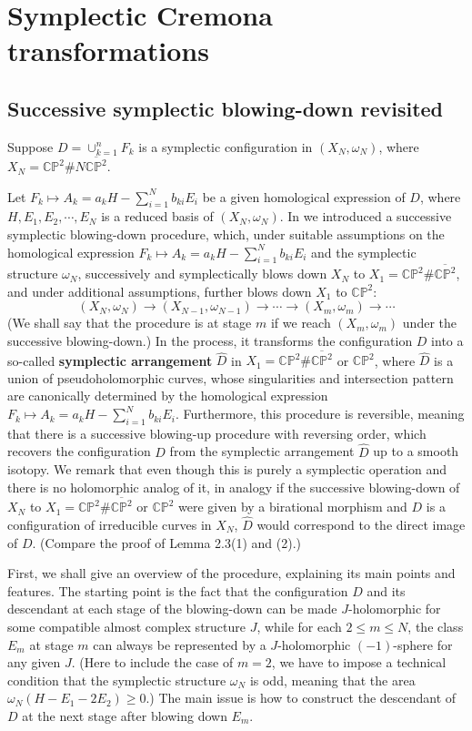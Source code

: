 \documentclass[11pt]{amsart}
\theoremstyle{plain}
\numberwithin{theorem}{section}
\theoremstyle{definition}
\newcommand{\C}{{\mathbb C}}
\renewcommand{\P}{{\mathbb P}}
\begin{document}
\section{Symplectic Cremona transformations}

\subsection{Successive symplectic blowing-down revisited}
Suppose $D=\cup_{k=1}^n F_k$ is a symplectic configuration in $(X_N,\omega_N)$, where $X_N=\C\P^2\# N\overline{\C\P^2}$. 

Let $F_k\mapsto A_k=a_k H-\sum_{i=1}^N b_{ki} E_i$ be a given homological expression of $D$, where $H,E_1,E_2,\cdots, E_N$ is a reduced basis of 
$(X_N,\omega_N)$. In \cite{C1} we introduced a successive symplectic blowing-down procedure, which, under suitable assumptions on the homological expression $F_k\mapsto A_k=a_k H-\sum_{i=1}^N b_{ki} E_i$ and the symplectic structure $\omega_N$, successively and symplectically blows down $X_N$ to $X_1=\C\P^2\#\overline{\C\P^2}$, and under
additional assumptions, further blows down $X_1$ to $\C\P^2$: 
$$
(X_N,\omega_N)\rightarrow (X_{N-1},\omega_{N-1})\rightarrow \cdots \rightarrow (X_m,\omega_m)
\rightarrow \cdots 
$$
(We shall say that the procedure is at stage $m$ if we reach $(X_m,\omega_m)$ under the successive blowing-down.) In the process, it transforms the configuration $D$ into a so-called {\bf symplectic arrangement} $\hat{D}$ in $X_1=\C\P^2\#\overline{\C\P^2}$ or $\C\P^2$, where $\hat{D}$ is a union of pseudoholomorphic curves, whose singularities and intersection pattern are canonically determined by the homological expression $F_k\mapsto A_k=a_k H-\sum_{i=1}^N b_{ki} E_i$.  Furthermore, this procedure is reversible, meaning that there is a successive blowing-up procedure with reversing order, which recovers the configuration $D$ from the symplectic arrangement $\hat{D}$ up to a smooth isotopy. We remark that even though this is purely a symplectic operation and there is no holomorphic analog of it, in analogy if the successive blowing-down of $X_N$ to $X_1=\C\P^2\#\overline{\C\P^2}$ or $\C\P^2$ were given by a birational morphism and $D$ is a configuration of irreducible curves in $X_N$, $\hat{D}$ would correspond to the direct image of $D$. (Compare the proof of Lemma 2.3(1) and (2).)


First, we shall give an overview of the procedure, explaining its main points and features. The starting point is the fact that the configuration $D$ and its descendant at each stage of the blowing-down can be made $J$-holomorphic for some compatible almost complex structure $J$, while for each 
$2\leq m\leq N$, the class $E_m$ at stage $m$ can always be represented by a $J$-holomorphic 
$(-1)$-sphere for any given $J$. (Here to include the case of $m=2$, we have to impose a technical condition that the symplectic structure $\omega_N$ is odd, meaning that the area $\omega_N(H-E_1-2E_2)\geq 0$.) The main issue is how to construct the descendant of $D$ at the next stage
after blowing down $E_m$. 
\end{document}
